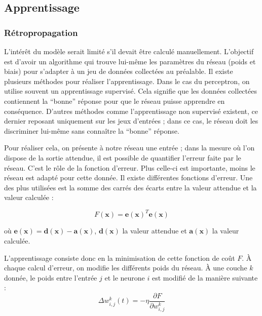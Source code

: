 \subsection{Apprentissage}

\subsubsection{Rétropropagation}

L'intérêt du modèle serait limité s'il devait être calculé manuellement. L'objectif est d'avoir un algorithme qui trouve lui-même les paramètres du réseau
(poids et biais) pour s'adapter à un jeu de données collectées au préalable. Il existe plusieurs méthodes pour réaliser l'apprentissage. Dans le cas du 
perceptron, on utilise souvent un apprentissage supervisé. Cela signifie que les données collectées contiennent la ``bonne'' réponse pour que 
le réseau puisse apprendre en conséquence. D'autres méthodes comme l'apprentissage non supervisé existent, ce dernier reposant uniquement sur les jeux 
d'entrées ; dans ce cas, le réseau doit les discriminer lui-même sans connaître la ``bonne'' réponse.

Pour réaliser cela, on présente à notre réseau une entrée ; dans la mesure où l'on dispose de la sortie attendue, il est possible de quantifier l'erreur
faite par le réseau.
C'est le rôle de la fonction d'erreur. Plus celle-ci est importante, moins le réseau est adapté pour cette donnée. Il existe différentes fonctions
d'erreur. Une des plus utilisées est la somme des carrés des écarts entre la valeur attendue et la valeur calculée : 

\begin{equation}
\displaystyle F\left(\mathbf{x}\right) = \mathbf{e\left(x\right)}^T\mathbf{e\left(x\right)} 
\end{equation}

où $\displaystyle \mathbf{e\left(x\right)} = \mathbf{d\left(x\right)} - \mathbf{a\left(x\right)} $,
$\mathbf{d\left(x\right)}$ la valeur attendue et $\mathbf{a\left(x\right)}$ la valeur calculée.


L'apprentissage consiste donc en la minimisation de cette fonction de coût $F$. À chaque calcul d'erreur, on modifie les différents poids du réseau.
À une couche $k$ donnée, le poids entre l'entrée $j$ et le neurone $i$ est modifié de la manière suivante : 
\begin{equation}
 \Delta w^k_{i,j}\left(t\right) = - \eta \frac{\partial F}{\partial w^k_{i,j}}
\end{equation}
 
